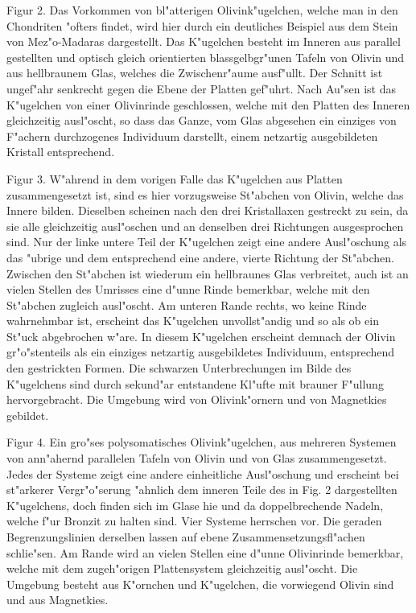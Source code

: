 \documentclass[a4paper, 11pt, oneside, polutonikogreek, german]{article}
\begin{document}
Figur 2. Das Vorkommen von bl"atterigen Olivink"ugelchen, welche man in den Chondriten "ofters findet, wird hier durch ein deutliches Beispiel aus dem Stein von Mez"o-Madaras dargestellt. Das K"ugelchen besteht im Inneren aus parallel gestellten und optisch gleich orientierten blassgelbgr"unen Tafeln von Olivin und aus hellbraunem Glas, welches die Zwischenr"aume ausf"ullt. Der Schnitt ist ungef"ahr senkrecht gegen die Ebene der Platten gef"uhrt. Nach Au"sen ist das K"ugelchen von einer Olivinrinde geschlossen, welche mit den Platten des Inneren gleichzeitig ausl"oscht, so dass das Ganze, vom Glas abgesehen ein einziges von F"achern durchzogenes Individuum darstellt, einem netzartig ausgebildeten Kristall entsprechend.

Figur 3. W"ahrend in dem vorigen Falle das K"ugelchen aus Platten zusammengesetzt ist, sind es hier vorzugsweise St"abchen von Olivin, welche das Innere bilden. Dieselben scheinen nach den drei Kristallaxen gestreckt zu sein, da sie alle gleichzeitig ausl"oschen und an denselben drei Richtungen ausgesprochen sind. Nur der linke untere Teil der K"ugelchen zeigt eine andere Ausl"oschung als das "ubrige und dem entsprechend eine andere, vierte Richtung der St"abchen. Zwischen den St"abchen ist wiederum ein hellbraunes Glas verbreitet, auch ist an vielen Stellen des Umrisses eine d"unne Rinde bemerkbar, welche mit den St"abchen zugleich ausl"oscht. Am unteren Rande rechts, wo keine Rinde wahrnehmbar ist, erscheint das K"ugelchen unvollst"andig und so als ob ein St"uck abgebrochen w"are. In diesem K"ugelchen erscheint demnach der Olivin gr"o"stenteils als ein einziges netzartig ausgebildetes Individuum, entsprechend den gestrickten Formen. Die schwarzen Unterbrechungen im Bilde des K"ugelchens sind durch sekund"ar entstandene Kl"ufte mit brauner F"ullung hervorgebracht. Die Umgebung wird von Olivink"ornern und von Magnetkies gebildet.

Figur 4. Ein gro"ses polysomatisches Olivink"ugelchen, aus mehreren Systemen von ann"ahernd parallelen Tafeln von Olivin und von Glas zusammengesetzt. Jedes der Systeme zeigt eine andere einheitliche Ausl"oschung und erscheint bei st"arkerer Vergr"o"serung "ahnlich dem inneren Teile des in Fig. 2 dargestellten K"ugelchens, doch finden sich im Glase hie und da doppelbrechende Nadeln, welche f"ur Bronzit zu halten sind. Vier Systeme herrschen vor. Die geraden Begrenzungslinien derselben lassen auf ebene Zusammensetzungsfl"achen schlie"sen. Am Rande wird an vielen Stellen eine d"unne Olivinrinde bemerkbar, welche mit dem zugeh"origen Plattensystem gleichzeitig ausl"oscht. Die Umgebung besteht aus K"ornchen und K"ugelchen, die vorwiegend Olivin sind und aus Magnetkies.
\clearpage
\end{document}
